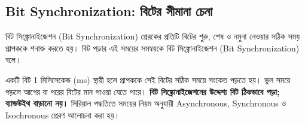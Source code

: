\subsection{Bit Synchronization: বিটের সীমানা চেনা}
\label{ch2:c02-03}
\begin{definitionbox}{বিট সিঙ্ক্রোনাইজেশন (Bit Synchronization)}
প্রেরকের প্রতিটি বিটের শুরু, শেষ ও নমুনা নেওয়ার সঠিক সময় প্রাপককে শনাক্ত করতে হয়। বিট পড়ার এই সময়ের সমন্বয়কে বিট সিঙ্ক্রোনাইজেশন (Bit Synchronization) বলে।
\end{definitionbox}
একটি বিট 1 মিলিসেকেন্ড (ms) স্থায়ী হলে প্রাপককে সেই বিটের সঠিক সময়ে সংকেত পড়তে হয়। ভুল সময়ে পড়লে আগের বা পরের বিটের মান পাওয়া যেতে পারে। \textbf{বিট সিঙ্ক্রোনাইজেশনের উদ্দেশ্য বিট ঠিকভাবে পড়া; ব্যান্ডউইথ বাড়ানো নয়।} সিরিয়াল পদ্ধতিতে সময়ের নিয়ম অনুযায়ী Asynchronous, Synchronous ও Isochronous প্রেরণ আলোচনা করা হয়।

